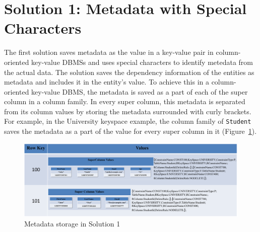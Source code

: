 % 		
% 		
		
	
\section{Solution 1:  Metadata with Special Characters}\label{s:sol1}

	
	The first solution saves metadata as the value in a key-value pair  in
	column-oriented key-value \acp{DBMS} and uses special characters to identify
	metedata from the actual data.
	The solution saves the dependency information of the entities as
	metadata and includes it in the entity's value. To achieve this in a column-oriented key-value
	\ac{DBMS}, the metadata is saved as a part of each of the super column  in a column family.
	In every super column,  this metadata is separated from its column values
	 by storing the metadata surrounded with curly brackets. For example,  in the
	 University keyspace example,  the column family of \texttt{Student} saves
	 the metadata as a part of the value  for every  super
	 column in it (Figure~\ref{f:sol1-Student-md}).
	 
	\begin{figure}[H]
		\centering
		\includegraphics[width=1\textwidth]{./figure/Solutions/Solution1-Student-MD.png}
		\caption{Metadata storage in Solution 1}\label{f:sol1-Student-md}
	\end{figure}
	 
